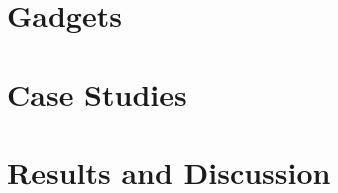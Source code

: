 \documentclass[sigconf]{acmart}
\begin{document}
\section{Gadgets}

%
\section{Case Studies}

%
\section{Results and Discussion}







\end{document}
